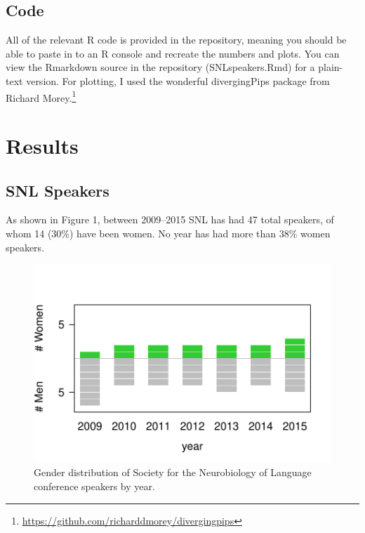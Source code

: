 \documentclass{winnower}
\begin{document}
\subsection{Code}


All of the relevant R code is provided in the repository, meaning you should be able to paste in to an R console and recreate the numbers and plots. You can view the Rmarkdown source in the repository ({\ttfamily SNLspeakers.Rmd}) for a plain-text version. For plotting, I used the wonderful {\ttfamily divergingPips} package from Richard Morey.\footnote{\url{https://github.com/richarddmorey/divergingpips}}



\section{Results}

\subsection{SNL Speakers}

As shown in Figure 1, between 2009--2015 SNL has had 47 total speakers, of whom 14 (30\%) have been women. No year has had more than 38\% women speakers.

\begin{figure}
\begin{center}
\includegraphics[scale=0.8]{SNLspeakerfigure.pdf}\vspace{0cm}
\caption
{Gender distribution of Society for the Neurobiology of Language conference speakers by year.}
\label{figSpeakers}
\end{center}
\end{figure}
\end{document}
